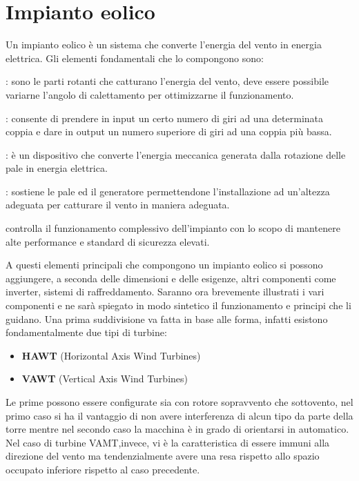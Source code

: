 \section{Impianto eolico}
Un impianto eolico è un sistema che converte l'energia del vento in energia elettrica.
Gli elementi fondamentali che lo compongono sono:
\begin{description}[labelindent=5mm]
    \item[$\bullet$ Pale eoliche]: sono le parti rotanti che catturano l'energia del vento, deve essere possibile variarne l'angolo di calettamento per ottimizzarne il funzionamento.
    \item[$\bullet$ Moltiplicatore di giri]: consente di prendere in input un certo numero di giri ad una determinata coppia e dare in output un numero superiore di giri ad una coppia più bassa.
    \item[$\bullet$ Generatore eolico]: è un dispositivo che converte l'energia meccanica generata dalla rotazione delle pale in energia elettrica.
    \item[$\bullet$ Torre eolica]: sostiene le pale ed il generatore permettendone l'installazione ad un'altezza adeguata per catturare il vento in maniera adeguata.
    \item[$\bullet$ Elettronica di controllo] controlla il funzionamento complessivo dell'impianto con lo scopo di mantenere alte performance e standard di sicurezza elevati.
\item \end{description}
A questi elementi principali che compongono un impianto eolico si possono aggiungere, a seconda delle dimensioni e delle esigenze, altri componenti come inverter, sistemi di raffreddamento.
Saranno ora brevemente illustrati i vari componenti e ne sarà spiegato in modo sintetico il funzionamento e principi che li guidano.
Una prima suddivisione va fatta in base alle forma, infatti esistono fondamentalmente due tipi di turbine:
\begin{itemize}
    \item \textbf{HAWT} (Horizontal Axis Wind Turbines)
    \item \textbf{VAWT} (Vertical Axis Wind Turbines)
\end{itemize}
Le prime possono essere configurate sia con rotore sopravvento che sottovento, nel primo caso si ha il vantaggio di non avere interferenza di alcun tipo da parte della torre mentre nel secondo caso la macchina è in grado di orientarsi in automatico.
Nel caso di turbine VAMT,invece, vi è la caratteristica di essere immuni alla direzione del vento ma tendenzialmente avere una resa rispetto allo spazio occupato inferiore rispetto al caso precedente.
